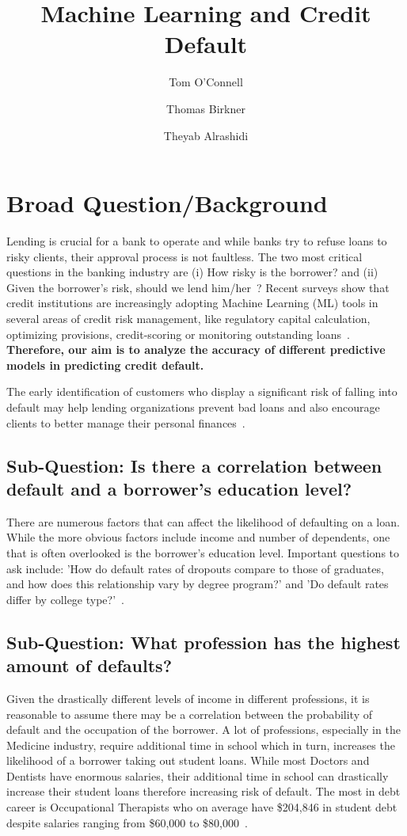 \documentclass{article}
\title{Machine Learning and Credit Default}
\author[1]{Tom O'Connell}
\author[2]{Thomas Birkner}
\author[3]{Theyab Alrashidi}
\affil[1]{Arizona State University, Tempe, AZ 85281, USA }
\date{}
\begin{document}
\maketitle

\section{Broad Question/Background}

Lending is crucial for a bank to operate and while banks try to refuse loans to risky clients, their approval process is not faultless. The two most critical questions in the banking industry are (i) How risky is the borrower? and (ii) Given the borrower's risk, should we lend him/her~\cite{madaan2021loan}? Recent surveys show that credit institutions are increasingly adopting Machine Learning (ML) tools in several areas of credit risk management, like regulatory capital calculation, optimizing provisions, credit-scoring or monitoring outstanding loans~\cite{alonso2021understanding}. \textbf{Therefore, our aim is to analyze the accuracy of different predictive models in predicting  credit default.} 
 
The early identification of customers who display a significant risk of falling into default may help lending organizations prevent bad loans and also encourage clients to better manage their personal finances~\cite{cocser2019predictive}.


\subsection{Sub-Question: Is there a correlation between default and a borrower's education level?}

There are numerous factors that can affect the likelihood of defaulting on a loan. While the more obvious factors include income and number of dependents, one that is often overlooked is the borrower's education level. Important questions to ask include: 'How do default rates of dropouts compare to those of graduates, and how does this relationship vary by degree program?' and 'Do default rates differ by college type?'~\cite{chakrabarti2017more}.


\subsection{Sub-Question: What profession has the highest amount of defaults?}

Given the drastically different levels of income in different professions, it is reasonable to assume there may be a correlation between the probability of default and the occupation of the borrower. A lot of professions, especially in the Medicine industry, require additional time in school which in turn, increases the likelihood of a borrower taking out student loans. While most Doctors and Dentists have enormous salaries, their additional time in school can drastically increase their student loans therefore increasing risk of default. The most in debt career is Occupational Therapists who on average have \$204,846 in student debt despite salaries ranging from \$60,000 to \$80,000~\cite{hornsby_2024}.
\end{document}
